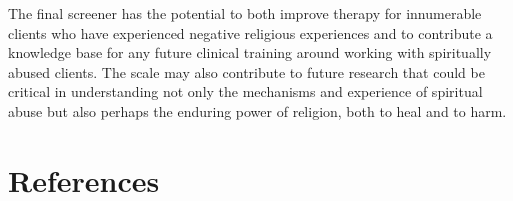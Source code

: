 \documentclass[
  letterpaper,
  DIV=11,
  numbers=noendperiod]{scrreport}
\begin{document}
The final screener has the potential to both improve therapy for
innumerable clients who have experienced negative religious experiences
and to contribute a knowledge base for any future clinical training
around working with spiritually abused clients. The scale may also
contribute to future research that could be critical in understanding
not only the mechanisms and experience of spiritual abuse but also
perhaps the enduring power of religion, both to heal and to harm.


\hypertarget{references}{%
\chapter*{References}\label{references}}
\end{document}
